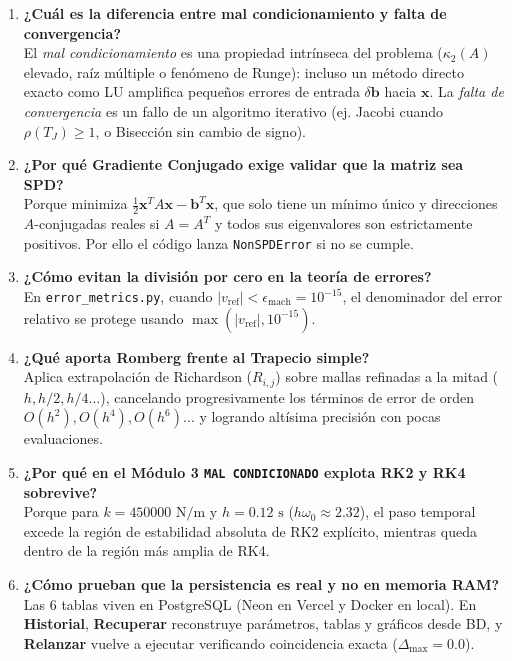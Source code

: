 \documentclass[11pt,a4paper]{article}
\begin{document}
\begin{enumerate}
    \item \textbf{¿Cuál es la diferencia entre mal condicionamiento y falta de convergencia?}\\
    El \textit{mal condicionamiento} es una propiedad intrínseca del problema ($\kappa_2(A)$ elevado, raíz múltiple o fenómeno de Runge): incluso un método directo exacto como LU amplifica pequeños errores de entrada $\delta\mathbf{b}$ hacia $\mathbf{x}$. La \textit{falta de convergencia} es un fallo de un algoritmo iterativo (ej. Jacobi cuando $\rho(T_J)\ge 1$, o Bisección sin cambio de signo).

    \item \textbf{¿Por qué Gradiente Conjugado exige validar que la matriz sea SPD?}\\
    Porque minimiza $\frac{1}{2}\mathbf{x}^T A\mathbf{x} - \mathbf{b}^T\mathbf{x}$, que solo tiene un mínimo único y direcciones $A$-conjugadas reales si $A=A^T$ y todos sus eigenvalores son estrictamente positivos. Por ello el código lanza \texttt{NonSPDError} si no se cumple.

    \item \textbf{¿Cómo evitan la división por cero en la teoría de errores?}\\
    En \texttt{error\_metrics.py}, cuando $|v_{\text{ref}}| < \epsilon_{\text{mach}} = 10^{-15}$, el denominador del error relativo se protege usando $\max(|v_{\text{ref}}|, 10^{-15})$.

    \item \textbf{¿Qué aporta Romberg frente al Trapecio simple?}\\
    Aplica extrapolación de Richardson ($R_{i,j}$) sobre mallas refinadas a la mitad ($h, h/2, h/4\dots$), cancelando progresivamente los términos de error de orden $O(h^2), O(h^4), O(h^6)\dots$ y logrando altísima precisión con pocas evaluaciones.

    \item \textbf{¿Por qué en el Módulo 3 \texttt{MAL CONDICIONADO} explota RK2 y RK4 sobrevive?}\\
    Porque para $k=450000\text{ N/m}$ y $h=0.12\text{ s}$ ($h\omega_0 \approx 2.32$), el paso temporal excede la región de estabilidad absoluta de RK2 explícito, mientras queda dentro de la región más amplia de RK4.

    \item \textbf{¿Cómo prueban que la persistencia es real y no en memoria RAM?}\\
    Las 6 tablas viven en PostgreSQL (Neon en Vercel y Docker en local). En \textbf{Historial}, \textbf{Recuperar} reconstruye parámetros, tablas y gráficos desde BD, y \textbf{Relanzar} vuelve a ejecutar verificando coincidencia exacta ($\Delta_{\max} = 0.0$).
\end{enumerate}
\end{document}
